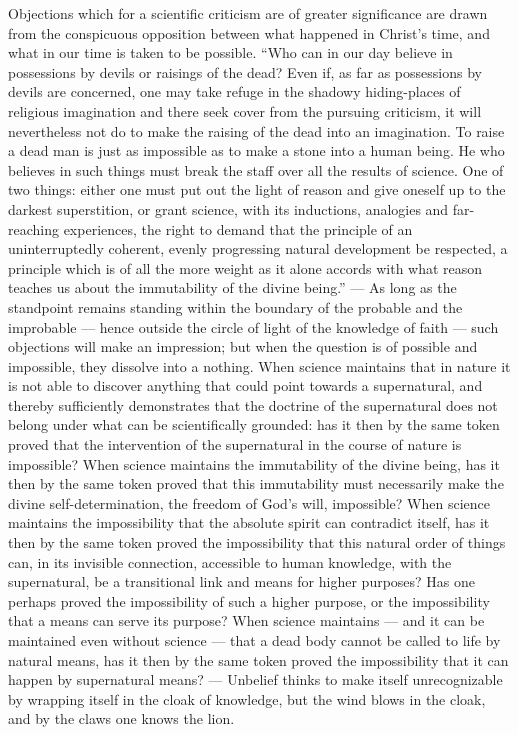\documentclass[12pt,a4paper,openany]{book}
\newcommand{\opage}[1]{\marginnote{\footnotesize\textit{[#1]}}}
\begin{document}
Objections which for a scientific criticism
are of greater significance are drawn from the conspicuous
opposition between what happened in Christ's time, and %
what in our time is taken to be possible. ``Who can in
our day believe in possessions by devils or raisings
of the dead? Even if, as far as possessions by devils are concerned,
one may take refuge in the shadowy hiding-places of religious imagination
and there seek cover from the pursuing
criticism, it will nevertheless not do to make the raising of the dead
into an imagination. To raise a dead man is
just as impossible as to make a stone into a human being.
He who believes in such things must break the staff over all
the results of science. One of two things: either one must
put out the light of reason and give oneself up to the darkest
superstition, or grant science, with its inductions,
analogies and far-reaching experiences, the right to
demand that the principle of an uninterruptedly coherent,
evenly progressing natural development be respected, a
principle which is of all the more weight as
it alone accords with what reason teaches us about
\setcounter{footnote}{0}%
\opage{69}the immutability of the divine being.'' --- As long as
the standpoint remains standing within the boundary of the probable
and the improbable --- hence outside the circle of light of the knowledge of faith
--- such objections will make
an impression; but when the question is of possible and
impossible, they dissolve into a nothing. When science
maintains that in nature it is not able to discover
anything that could point towards a supernatural, and
thereby sufficiently demonstrates that the doctrine of the supernatural
does not belong under what can be scientifically
grounded: has it then by the same token proved
that the intervention of the supernatural in the course of nature is
impossible? When science maintains the immutability of the divine
being, has it then by the same token
proved that this immutability must necessarily make
the divine self-determination, the freedom of God's will,
impossible? When science maintains the impossibility that
the absolute spirit can contradict itself, has it then
by the same token proved the impossibility that this
natural order of things can, in its invisible connection, accessible to
human knowledge, with the
supernatural, be a transitional link and means for
higher purposes? Has one perhaps proved the impossibility of such a %
higher purpose, or the impossibility that
a means can serve its purpose? When science
maintains --- and it can be maintained even without science
--- that a dead body cannot be called to life by
natural means, has it then by the same token proved
the impossibility that it can happen by supernatural
means? --- Unbelief thinks to make itself unrecognizable by
wrapping itself in the cloak of knowledge, but the wind blows
in the cloak, and by the claws one knows the lion.
\end{document}
